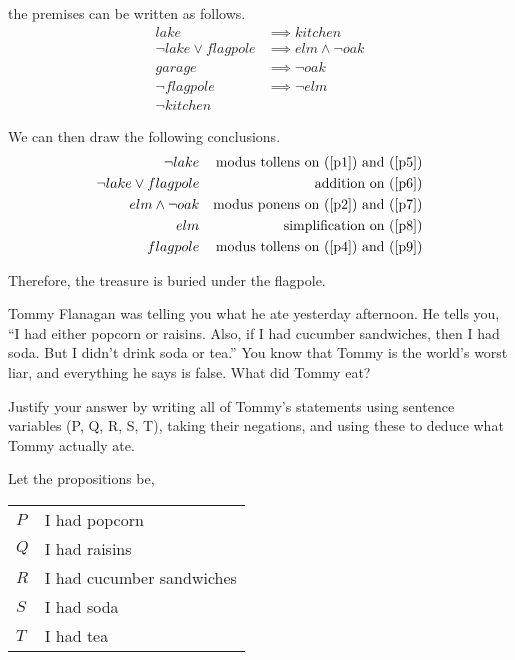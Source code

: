 \documentclass[a4paper]{exam}
\begin{document}
\begin{questions}
\begin{solution}
    the premises can be written as follows.
    \begin{align}
      lake & \implies kitchen \label{p1}\\
      \neg lake \lor flagpole &\implies elm \land \neg oak \label{p2}\\
      garage &\implies \neg oak \label{p3}\\
      \neg flagpole &\implies \neg elm \label{p4}\\
      \neg kitchen \label{p5}
    \end{align}

    We can then draw the following conclusions.
    \begin{align}
      \neg lake && \text{modus tollens on (\ref{p1}) and (\ref{p5})} \label{p6}\\
      \neg lake \lor flagpole && \text{addition on (\ref{p6})} \label{p7}\\
      elm \land \neg oak && \text{modus ponens on (\ref{p2}) and  (\ref{p7})} \label{p8}\\
      elm && \text{simplification on (\ref{p8})} \label{p9}\\
      flagpole && \text{modus tollens on (\ref{p4}) and (\ref{p9})} \label{p10}
    \end{align}

    Therefore, the treasure is buried under the flagpole.
  \end{solution}
  
\question Tommy Flanagan was telling you what he ate yesterday afternoon. He tells you, ``I had either popcorn or raisins. Also, if I had cucumber sandwiches, then I had soda. But I didn't drink soda or tea.'' You know that Tommy is the world’s worst liar, and everything he says is false. What did Tommy eat?
  
Justify your answer by writing all of Tommy's statements using sentence variables (P, Q, R, S, T), taking their negations, and using these to deduce what Tommy actually ate.

  \begin{solution}
    Let the propositions be,\\
    \begin{tabular}{l@{ : }l}
      $P$ & I had popcorn\\
      $Q$ & I had raisins\\
      $R$ & I had cucumber sandwiches\\
      $S$ & I had soda\\
      $T$ & I had tea
    \end{tabular}


\end{solution}
\end{questions}
\end{document}
